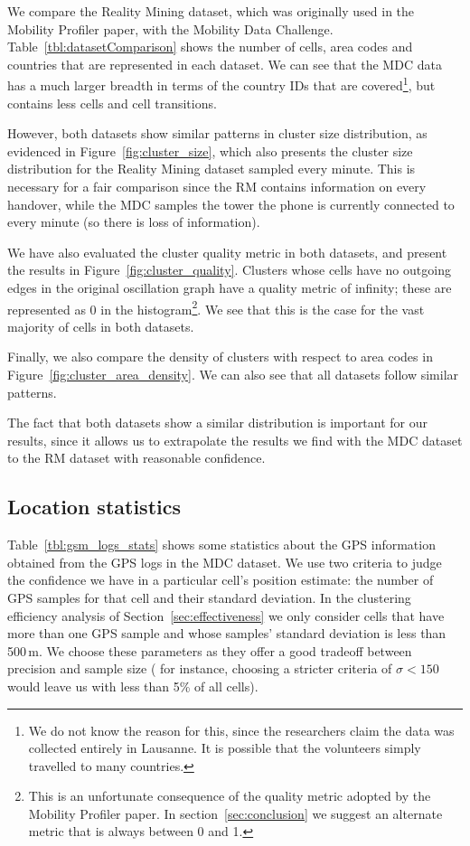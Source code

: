 \documentclass[letterpaper, 12pt, conference]{ieeeconf}
\begin{document}
We compare the Reality Mining dataset, which was originally used in the 
Mobility Profiler paper, with the Mobility Data Challenge.
Table~\ref{tbl:datasetComparison} shows the number of cells, area codes and countries 
that are represented in each dataset. We can see that the MDC data has a much 
larger breadth in terms of the country IDs that are covered\footnote{We do 
not know the reason for this, since the researchers claim the data was 
collected entirely in Lausanne. It is possible that the volunteers simply 
travelled to many countries.}, but contains less cells and cell transitions.

However, both datasets show similar patterns in cluster size distribution, as 
evidenced in Figure~\ref{fig:cluster_size}, which also presents the cluster 
size distribution for the Reality Mining dataset sampled every minute. This 
is necessary for a fair comparison since the RM contains information on every 
handover, while the MDC samples the tower the phone is currently connected to 
every minute (so there is loss of information).

We have also evaluated the cluster quality metric in both datasets, and 
present the results in Figure~\ref{fig:cluster_quality}. Clusters whose cells 
have no outgoing edges in the original oscillation graph have a quality 
metric of infinity; these are represented as 0 in the histogram\footnote{This 
is an unfortunate consequence of the quality metric adopted by the Mobility 
Profiler paper. In section~\ref{sec:conclusion} we suggest an alternate 
metric that is always between 0 and 1.}. We see that this is the case for the 
vast majority of cells in both datasets.

Finally, we also compare the density of clusters with respect to area codes 
in Figure~\ref{fig:cluster_area_density}. We can also see that all datasets 
follow similar patterns.

The fact that both datasets show a similar distribution is important for our 
results, since it allows us to extrapolate the results we find with the MDC 
dataset to the RM dataset with reasonable confidence.

\subsection{Location statistics}
\label{sec:location_stats}
Table~\ref{tbl:gsm_logs_stats} shows some statistics about the GPS 
information obtained from the GPS logs in the MDC dataset. We use two 
criteria to judge the confidence we have in a particular cell's position 
estimate: the number of GPS samples for that cell and their standard 
deviation. In the clustering efficiency analysis of
Section~\ref{sec:effectiveness} we only consider cells that have more than one GPS sample 
and whose samples' standard deviation is less than 500\,m. We choose these 
parameters as they offer a good tradeoff between precision and sample size (
for instance, choosing a stricter criteria of $\sigma < 150$ would leave us 
with less than 5\% of all cells).
\end{document}
